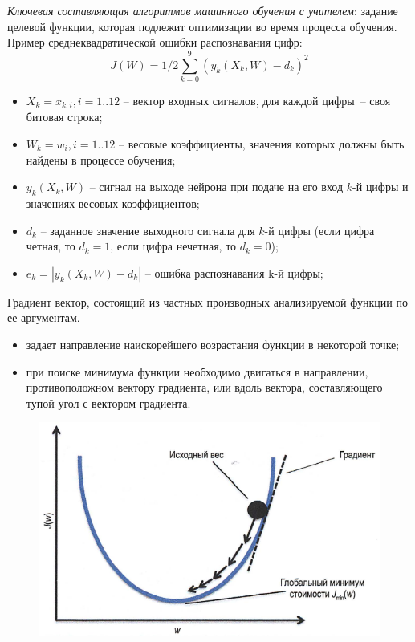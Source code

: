 \documentclass{beamer}
\begin{document}
\begin{frame}[t]
	\textit{Ключевая составляющая алгоритмов машинного обучения с учителем}: задание целевой функции, которая подлежит оптимизации во время процесса обучения.
	~
	Пример среднеквадратической ошибки распознавания цифр:
	\[J(W)=1/2 \sum_{k=0}^{9} (y_k(X_k, W)-d_k)^2\]
	\begin{itemize}
		\item $X_k={x_{k,i}, i=1..12}$ -- вектор входных сигналов, для каждой цифры~-- своя битовая строка;
		\item $W_k={w_{i}, i=1..12}$ -- весовые коэффициенты, значения которых должны быть найдены в процессе обучения;
		\item $y_k(X_k, W)$	-- сигнал на выходе нейрона при подаче на его вход $k$-й цифры и значениях весовых коэффициентов;
		\item $d_k$ -- заданное значение выходного сигнала для $k$-й цифры (если цифра четная, то $d_k=1$, если цифра нечетная, то $d_k=0$);		
		\item $e_k=|y_k(X_k, W)-d_k|$ -- ошибка распознавания k-й цифры;
	\end{itemize}
\end{frame}

\begin{frame}[t]
	\begin{block}{Градиент}
		вектор, состоящий из частных производных анализируемой функции по ее аргументам.	
	\end{block}
	\begin{itemize}
		\item задает направление наискорейшего возрастания функции в некоторой точке; 				\item при поиске минимума функции необходимо двигаться в направлении, противоположном вектору градиента, или вдоль вектора, составляющего тупой угол с вектором градиента.
	\end{itemize}
	\begin{figure}[h]
		\centering
		\includegraphics[scale=0.4]{images/lec03-pic21.png}
	\end{figure}
\end{frame}
\end{document}
